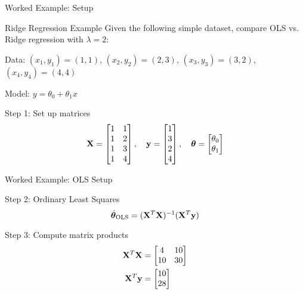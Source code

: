 \documentclass{beamer}
\begin{document}
\begin{frame}{Worked Example: Setup}
\begin{examplebox}{Ridge Regression Example}
Given the following simple dataset, compare OLS vs. Ridge regression with $\lambda = 2$:

\vspace{0.3cm}
Data: $(x_1, y_1) = (1, 1)$, $(x_2, y_2) = (2, 3)$, $(x_3, y_3) = (3, 2)$, $(x_4, y_4) = (4, 4)$

Model: $y = \theta_0 + \theta_1 x$
\end{examplebox}
\pause

\begin{codebox}{Step 1: Set up matrices}
$$\mathbf{X} = \begin{bmatrix} 1 & 1 \\ 1 & 2 \\ 1 & 3 \\ 1 & 4 \end{bmatrix}, \quad \mathbf{y} = \begin{bmatrix} 1 \\ 3 \\ 2 \\ 4 \end{bmatrix}, \quad \boldsymbol{\theta} = \begin{bmatrix} \theta_0 \\ \theta_1 \end{bmatrix}$$
\end{codebox}
\end{frame}

\begin{frame}{Worked Example: OLS Setup}
\begin{codebox}{Step 2: Ordinary Least Squares}
$$\hat{\boldsymbol{\theta}}_{\text{OLS}} = (\mathbf{X}^{T}\mathbf{X})^{-1}(\mathbf{X}^{T}\mathbf{y})$$
\end{codebox}
\pause

\begin{codebox}{Step 3: Compute matrix products}
\begin{align*}
\mathbf{X}^{T}\mathbf{X} &= \begin{bmatrix} 4 & 10 \\ 10 & 30 \end{bmatrix} \\
\mathbf{X}^{T}\mathbf{y} &= \begin{bmatrix} 10 \\ 28 \end{bmatrix}
\end{align*}
\end{codebox}
\end{frame}
\end{document}
